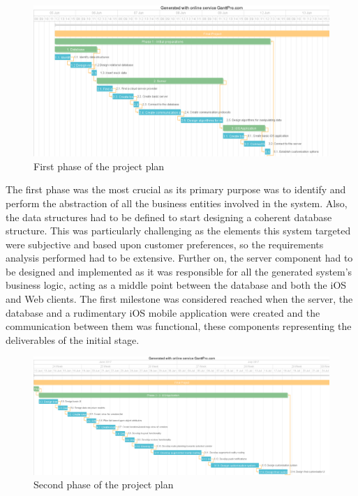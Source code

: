 \begin{figure}[!ht]
\centering
\includegraphics[scale=0.2]{img/phase1.png}
\caption{First phase of the project plan}
\label{fig:phase1}
\end{figure}

The first phase was the most crucial as its primary purpose was to identify and perform the abstraction of all the business entities involved in the system. Also, the data structures had to be defined to start designing a coherent database structure. This was particularly challenging as the elements this system targeted were subjective and based upon customer preferences, so the requirements analysis performed had to be extensive. Further on, the server component had to be designed and implemented as it was responsible for all the generated system's business logic, acting as a middle point between the database and both the iOS and Web clients. The first milestone was considered reached when the server, the database and a rudimentary iOS mobile application were created and the communication between them was functional, these components representing the deliverables of the initial stage.\\

\begin{figure}[!ht]
\centering
\includegraphics[scale=0.2]{img/phase2.png}
\caption{Second phase of the project plan}
\label{fig:phase2}
\end{figure}

